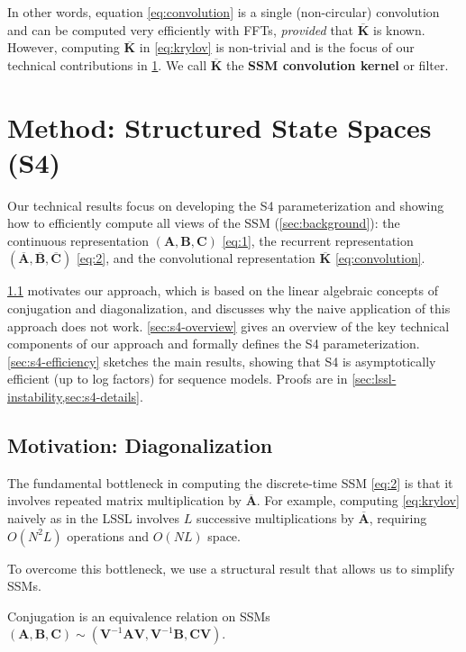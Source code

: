 \normalsize In other words, equation \eqref{eq:convolution} is a single (non-circular) convolution and can be computed very efficiently with FFTs, \emph{provided} that \( \bm{\overline{K}} \) is known. However, computing \( \bm{\overline{K}} \) in \eqref{eq:krylov} is non-trivial and is the focus of our technical contributions in \ref{sec:s4}.
We call \( \bm{\overline{K}} \) the \textbf{SSM convolution kernel} or filter.

\section{Method: Structured State Spaces (S4)}
\label{sec:s4}

Our technical results focus on developing the S4 parameterization and showing how to efficiently compute all views of the SSM (\ref{sec:background}):
the continuous representation \( (\bm{A}, \bm{B}, \bm{C}) \) \eqref{eq:1},
the recurrent representation \( (\bm{\overline{A}}, \bm{\overline{B}}, \bm{\overline{C}}) \) \eqref{eq:2},
and the convolutional representation \( \bm{\overline{K}} \) \eqref{eq:convolution}.

\ref{sec:s4-motivation} motivates our approach, which is based on the linear algebraic concepts of conjugation and diagonalization, and discusses why the naive application of this approach does not work.
\ref{sec:s4-overview} gives an overview of the key technical components of our approach and formally defines the S4 parameterization.
\ref{sec:s4-efficiency} sketches the main results, showing that S4 is asymptotically efficient (up to log factors) for sequence models. Proofs are in \ref{sec:lssl-instability,sec:s4-details}.

\subsection{Motivation: Diagonalization}
\label{sec:s4-motivation}

The fundamental bottleneck in computing the discrete-time SSM \eqref{eq:2} is that it involves repeated matrix multiplication by \( \bm{\overline{A}} \).
For example, computing \eqref{eq:krylov} naively as in the LSSL involves \( L \) successive multiplications by \( \bm{\overline{A}} \), requiring \( O(N^2 L) \) operations and \( O(NL) \) space.

To overcome this bottleneck, we use a structural result that allows us to simplify SSMs.

\begin{lemma}
  \label{lmm:conjugation}
  Conjugation is an equivalence relation on SSMs \small \( (\bm{A}, \bm{B}, \bm{C}) \sim (\bm{V}^{-1} \bm{A} \bm{V}, \bm{V}^{-1}\bm{B}, \bm{C}\bm{V}) \).
\end{lemma}

